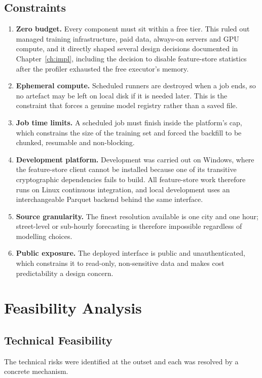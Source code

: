 \subsection{Constraints}
\begin{enumerate}
  \item \textbf{Zero budget.} Every component must sit within a free tier. This
  ruled out managed training infrastructure, paid data, always-on servers and
  GPU compute, and it directly shaped several design decisions documented in
  Chapter~\ref{ch:impl}, including the decision to disable feature-store
  statistics after the profiler exhausted the free executor's memory.
  \item \textbf{Ephemeral compute.} Scheduled runners are destroyed when a job
  ends, so no artefact may be left on local disk if it is needed later. This is
  the constraint that forces a genuine model registry rather than a saved file.
  \item \textbf{Job time limits.} A scheduled job must finish inside the
  platform's cap, which constrains the size of the training set and forced the
  backfill to be chunked, resumable and non-blocking.
  \item \textbf{Development platform.} Development was carried out on Windows,
  where the feature-store client cannot be installed because one of its
  transitive cryptographic dependencies fails to build. All feature-store work
  therefore runs on Linux continuous integration, and local development uses an
  interchangeable Parquet backend behind the same interface.
  \item \textbf{Source granularity.} The finest resolution available is one city
  and one hour; street-level or sub-hourly forecasting is therefore impossible
  regardless of modelling choices.
  \item \textbf{Public exposure.} The deployed interface is public and
  unauthenticated, which constrains it to read-only, non-sensitive data and makes
  cost predictability a design concern.
\end{enumerate}

\section{Feasibility Analysis}

\subsection{Technical Feasibility}
The technical risks were identified at the outset and each was resolved by a
concrete mechanism.

